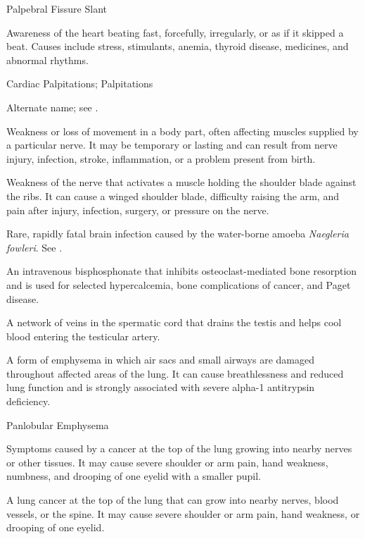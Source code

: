 \synonyms
Palpebral Fissure Slant

 Awareness of the heart beating fast, forcefully, irregularly, or as if it skipped a beat. Causes include stress, stimulants, anemia, thyroid disease, medicines, and abnormal rhythms.

\synonyms
Cardiac Palpitations; Palpitations

 Alternate name; see .

 Weakness or loss of movement in a body part, often affecting muscles supplied by a particular nerve. It may be temporary or lasting and can result from nerve injury, infection, stroke, inflammation, or a problem present from birth.

 Weakness of the nerve that activates a muscle holding the shoulder blade against the ribs. It can cause a winged shoulder blade, difficulty raising the arm, and pain after injury, infection, surgery, or pressure on the nerve.

 Rare, rapidly fatal brain infection caused by the water-borne amoeba \textit{Naegleria fowleri}. See .

 An intravenous bisphosphonate that inhibits osteoclast-mediated bone resorption and is used for selected hypercalcemia, bone complications of cancer, and Paget disease.

 A network of veins in the spermatic cord that drains the testis and helps cool blood entering the testicular artery.

 A form of emphysema in which air sacs and small airways are damaged throughout affected areas of the lung. It can cause breathlessness and reduced lung function and is strongly associated with severe alpha-1 antitrypsin deficiency.

\synonyms
Panlobular Emphysema

 Symptoms caused by a cancer at the top of the lung growing into nearby nerves or other tissues. It may cause severe shoulder or arm pain, hand weakness, numbness, and drooping of one eyelid with a smaller pupil.

 A lung cancer at the top of the lung that can grow into nearby nerves, blood vessels, or the spine. It may cause severe shoulder or arm pain, hand weakness, or drooping of one eyelid.


